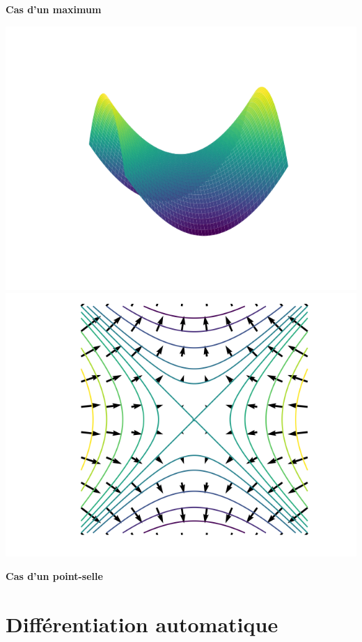 \documentclass[11pt,class=report,crop=false]{standalone}
\begin{document}
\begin{center}
\begin{minipage}{0.30\textwidth}
\quad\textbf{Cas d'un maximum}
\end{minipage}
\begin{minipage}{0.30\textwidth}
\center
\includegraphics[scale=\myscale,scale=0.35]{figures/gradient-surface-3c}\\

\includegraphics[scale=\myscale,scale=0.35]{figures/gradient-surface-5c}

\quad\textbf{Cas d'un point-selle}
\end{minipage}
\end{center}

\section{Différentiation automatique}
\end{document}
